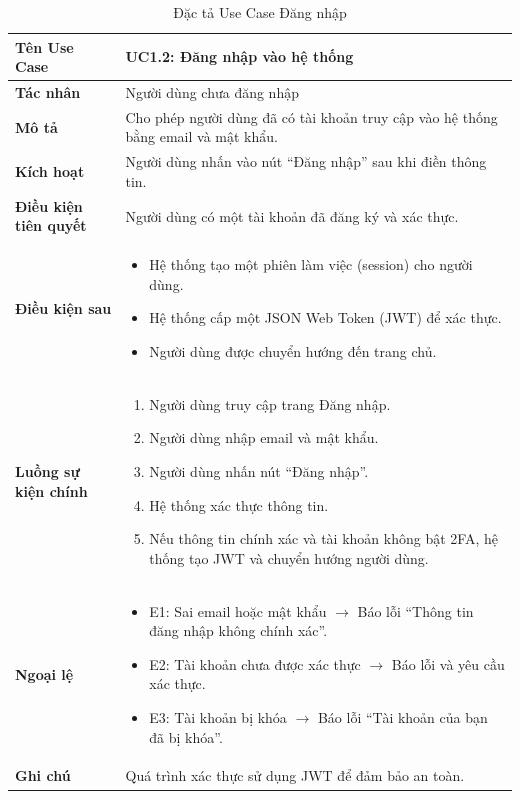 \begin{table}[H]
\centering
\begin{tabularx}{\textwidth}{|l|X|}
\hline
\textbf{Tên Use Case} & \textbf{UC1.2: Đăng nhập vào hệ thống} \\ \hline
\textbf{Tác nhân} & Người dùng chưa đăng nhập \\ \hline
\textbf{Mô tả} & Cho phép người dùng đã có tài khoản truy cập vào hệ thống bằng email và mật khẩu. \\ \hline
\textbf{Kích hoạt} & Người dùng nhấn vào nút ``Đăng nhập'' sau khi điền thông tin. \\ \hline
\textbf{Điều kiện tiên quyết} & Người dùng có một tài khoản đã đăng ký và xác thực. \\ \hline
\textbf{Điều kiện sau} & 
\begin{itemize}
    \item Hệ thống tạo một phiên làm việc (session) cho người dùng.
    \item Hệ thống cấp một JSON Web Token (JWT) để xác thực.
    \item Người dùng được chuyển hướng đến trang chủ.
\end{itemize} \\ \hline
\textbf{Luồng sự kiện chính} & 
\begin{enumerate}
    \item Người dùng truy cập trang Đăng nhập.
    \item Người dùng nhập email và mật khẩu.
    \item Người dùng nhấn nút ``Đăng nhập''.
    \item Hệ thống xác thực thông tin.
    \item Nếu thông tin chính xác và tài khoản không bật 2FA, hệ thống tạo JWT và chuyển hướng người dùng.
\end{enumerate} \\ \hline
\textbf{Ngoại lệ} & 
\begin{itemize}
    \item E1: Sai email hoặc mật khẩu $\rightarrow$ Báo lỗi ``Thông tin đăng nhập không chính xác''.
    \item E2: Tài khoản chưa được xác thực $\rightarrow$ Báo lỗi và yêu cầu xác thực.
    \item E3: Tài khoản bị khóa $\rightarrow$ Báo lỗi ``Tài khoản của bạn đã bị khóa''.
\end{itemize} \\ \hline
\textbf{Ghi chú} & Quá trình xác thực sử dụng JWT để đảm bảo an toàn. \\ \hline
\end{tabularx}
\caption{Đặc tả Use Case Đăng nhập}
\end{table}


